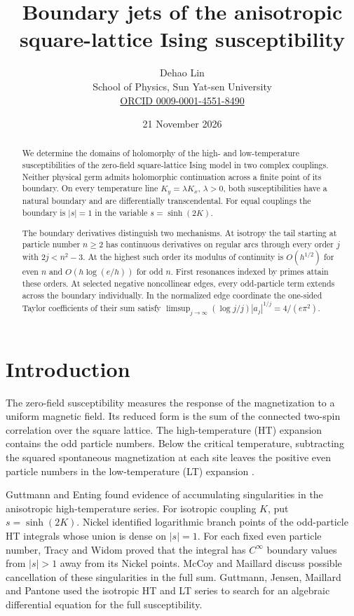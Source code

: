 \documentclass[11pt]{article}
\title{Boundary jets of the anisotropic\\square-lattice Ising susceptibility}
\author{Dehao Lin\\
  \small School of Physics, Sun Yat-sen University\\
  \small\href{https://orcid.org/0009-0001-4551-8490}{ORCID 0009-0001-4551-8490}}
\date{21 November 2026}
\numberwithin{equation}{section}
\theoremstyle{definition}
\begin{document}
\maketitle
\begin{abstract}
We determine the domains of holomorphy of the high- and low-temperature
susceptibilities of the zero-field square-lattice Ising model in two
complex couplings. Neither physical germ admits holomorphic continuation
across a finite point of its boundary. On every
temperature line $K_y=\lambda K_x$, $\lambda>0$, both susceptibilities
have a natural boundary and are differentially transcendental. For equal
couplings the boundary is $|s|=1$ in the variable $s=\sinh(2K)$.

The boundary derivatives distinguish two mechanisms. At isotropy the
tail starting at particle number $n\ge2$ has continuous derivatives on
regular arcs through every order $j$ with $2j<n^2-3$. At the highest
such order its modulus of continuity is $O(h^{1/2})$ for even $n$ and
$O(h\log(e/h))$ for odd $n$. First resonances indexed by primes attain
these orders. At selected negative noncollinear edges, every odd-particle
term extends across the boundary individually. In the normalized edge
coordinate the one-sided Taylor coefficients of their sum satisfy
$\limsup_{j\to\infty}(\log j/j)|a_j|^{1/j}=4/(e\pi^2)$.
\end{abstract}
\begingroup\small
\tableofcontents
\endgroup

\section{Introduction}\label{sec:introduction}

The zero-field susceptibility measures the response of the magnetization
to a uniform magnetic field. Its reduced form is the sum of the connected
two-spin correlation over the square lattice. The high-temperature (HT)
expansion contains the odd particle numbers. Below the critical temperature,
subtracting the squared spontaneous magnetization at each site leaves the
positive even particle numbers in the low-temperature (LT) expansion
\cite{ONGP}.

Guttmann and Enting \cite{GE} found evidence of accumulating singularities
in the anisotropic high-temperature series.
For isotropic coupling $K$, put $s=\sinh(2K)$. Nickel \cite{Nickel}
identified logarithmic branch points of the odd-particle HT integrals
whose union is dense on $|s|=1$. For each fixed even particle number,
Tracy and Widom \cite[Sec.~3, p.~1131]{TW} proved that the integral
has $C^\infty$ boundary values from $|s|>1$ away from its Nickel points.
McCoy and Maillard \cite[Sec.~3.7]{MM} discuss possible cancellation
of these singularities in the full sum. Guttmann, Jensen, Maillard and
Pantone \cite[Sec.~6]{GJMP} used the isotropic HT and LT series to
search for an algebraic differential equation for the full susceptibility.
\end{document}

